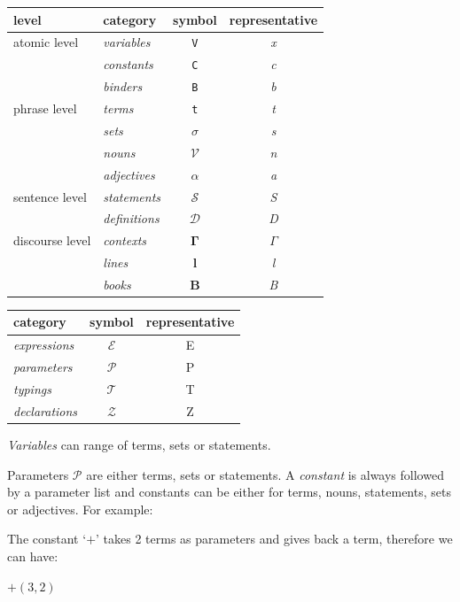 \begin{table}[H]
\centering
\begin{tabular}{|l|l|c|c|}
\hline
level & category & symbol & representative \\
\hline
atomic level & \emph{variables} & \texttt{V} & \emph{x} \\
& \emph{constants} &  \texttt{C} & \emph{c} \\
& \emph{binders} &  \texttt{B} & \emph{b} \\
\hline
phrase level & \emph{terms} & \texttt{t} & \emph{t} \\
& \emph{sets} & $\sigma$ & \emph{s} \\
& \emph{nouns} & $\mathcal{V}$ & \emph{n} \\
& \emph{adjectives} & $\alpha$ & \emph{a} \\
\hline
sentence level & \emph{statements} & $\mathcal{S}$ & \emph{S} \\
& \emph{definitions} & $\mathcal{D}$ & \emph{D} \\
\hline
discourse level & \emph{contexts} & $\mathbf{\Gamma}$ & $\Gamma$ \\
& \emph{lines} & \textbf{l} & \emph{l} \\
& \emph{books} & \textbf{B} & \emph{B} \\
\hline
\end{tabular}

\begin{tabular}{|l|c|c|}
\hline
category & symbol & representative \\
\hline
\emph{expressions} & $\mathcal{E}$ & E \\
\hline
\emph{parameters} & $\mathcal{P}$ & P \\
\hline
\emph{typings} & $\mathcal{T}$ & T \\
\emph{declarations} & $\mathcal{Z}$ & Z \\
\hline
\end{tabular}
\end{table}

\emph{Variables} can range of terms, sets or statements.

Parameters $\mathcal{P}$ are either terms, sets or statements. A \emph{constant}
is always followed by a parameter list and constants can be either for terms,
nouns, statements, sets or adjectives. For example:


\noindent The constant `$+$' takes 2 terms as parameters and gives back a term,
therefore we can have:

\begin{center}
$+(3, 2)$
\end{center}

